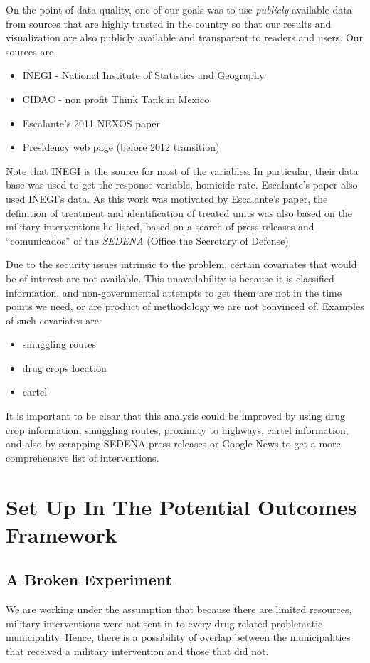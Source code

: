 \documentclass{article}[11 pt]
\begin{document}
On the point of data quality, one of our goals was to use \emph{publicly} available data from sources that are highly trusted in the country so that our results and visualization are also publicly available and transparent to readers and users.
Our sources are
		\begin{itemize}
			\item INEGI - National Institute of Statistics and Geography
			\item CIDAC -  non profit Think Tank in Mexico
			\item Escalante's 2011 NEXOS paper 
			\item Presidency web page (before 2012 transition)
		\end{itemize}
		Note that INEGI is the source for most of the variables. In particular, their data base was used to get the response variable, homicide rate. Escalante's paper also used INEGI's data. As this work was motivated by Escalante's paper, the definition of treatment and identification of treated units was also based on the military interventions he listed, based on a search of press releases and ``comunicados'' of the \emph{SEDENA} (Office the Secretary of Defense)
		
Due to the security issues intrinsic to the problem, certain covariates that would be of interest are not available. This unavailability is because it is classified information, and non-governmental attempts to get them are not in the time points we need, or are product of methodology we are not convinced of. Examples of such covariates are:
	\begin{itemize}
		\item smuggling routes
		\item drug crops location
		\item cartel
	\end{itemize}
	It is important to be clear that this analysis could be improved by using drug crop information, smuggling routes, proximity to highways, cartel information, and also by scrapping SEDENA press releases or Google News to get a more comprehensive list of interventions.

\section{Set Up In The Potential Outcomes Framework}
\subsection{A Broken Experiment}We are working under the assumption that because there are limited resources, military interventions were not sent in to every drug-related problematic municipality. Hence, there is a possibility of overlap between the municipalities that received a military intervention and those that did not.
\end{document}
